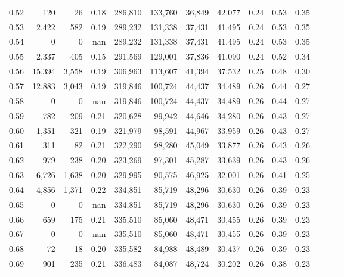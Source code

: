 \begin{tabular}{rrrrrrrrrrrrrr}
0.52 &     120 &     26 &  0.18 &  286,810 &  133,760 &  36,849 &  42,077 &  0.24 &  0.53 &      0.35 \\
0.53 &   2,422 &    582 &  0.19 &  289,232 &  131,338 &  37,431 &  41,495 &  0.24 &  0.53 &      0.35 \\
0.54 &       0 &      0 &   nan &  289,232 &  131,338 &  37,431 &  41,495 &  0.24 &  0.53 &      0.35 \\
0.55 &   2,337 &    405 &  0.15 &  291,569 &  129,001 &  37,836 &  41,090 &  0.24 &  0.52 &      0.34 \\
0.56 &  15,394 &  3,558 &  0.19 &  306,963 &  113,607 &  41,394 &  37,532 &  0.25 &  0.48 &      0.30 \\
0.57 &  12,883 &  3,043 &  0.19 &  319,846 &  100,724 &  44,437 &  34,489 &  0.26 &  0.44 &      0.27 \\
0.58 &       0 &      0 &   nan &  319,846 &  100,724 &  44,437 &  34,489 &  0.26 &  0.44 &      0.27 \\
0.59 &     782 &    209 &  0.21 &  320,628 &   99,942 &  44,646 &  34,280 &  0.26 &  0.43 &      0.27 \\
0.60 &   1,351 &    321 &  0.19 &  321,979 &   98,591 &  44,967 &  33,959 &  0.26 &  0.43 &      0.27 \\
0.61 &     311 &     82 &  0.21 &  322,290 &   98,280 &  45,049 &  33,877 &  0.26 &  0.43 &      0.26 \\
0.62 &     979 &    238 &  0.20 &  323,269 &   97,301 &  45,287 &  33,639 &  0.26 &  0.43 &      0.26 \\
0.63 &   6,726 &  1,638 &  0.20 &  329,995 &   90,575 &  46,925 &  32,001 &  0.26 &  0.41 &      0.25 \\
0.64 &   4,856 &  1,371 &  0.22 &  334,851 &   85,719 &  48,296 &  30,630 &  0.26 &  0.39 &      0.23 \\
0.65 &       0 &      0 &   nan &  334,851 &   85,719 &  48,296 &  30,630 &  0.26 &  0.39 &      0.23 \\
0.66 &     659 &    175 &  0.21 &  335,510 &   85,060 &  48,471 &  30,455 &  0.26 &  0.39 &      0.23 \\
0.67 &       0 &      0 &   nan &  335,510 &   85,060 &  48,471 &  30,455 &  0.26 &  0.39 &      0.23 \\
0.68 &      72 &     18 &  0.20 &  335,582 &   84,988 &  48,489 &  30,437 &  0.26 &  0.39 &      0.23 \\
0.69 &     901 &    235 &  0.21 &  336,483 &   84,087 &  48,724 &  30,202 &  0.26 &  0.38 &      0.23 \\

\end{tabular}
